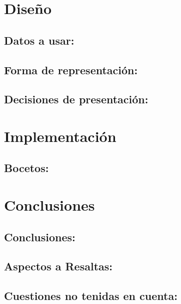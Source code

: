 \documentclass{article}
\begin{document}
	\section{Diseño}
	
		\subsection{Datos a usar:}
	
	
		\subsection{Forma de representación:}
	
	
		\subsection{Decisiones de presentación:}


	\section{Implementación}

		\subsection{Bocetos:}

	
	\section{Conclusiones}
	
		\subsection{Conclusiones:}
	
	
		\subsection{Aspectos a Resaltas:}
	
	
		\subsection{Cuestiones no tenidas en cuenta:}
\end{document}
